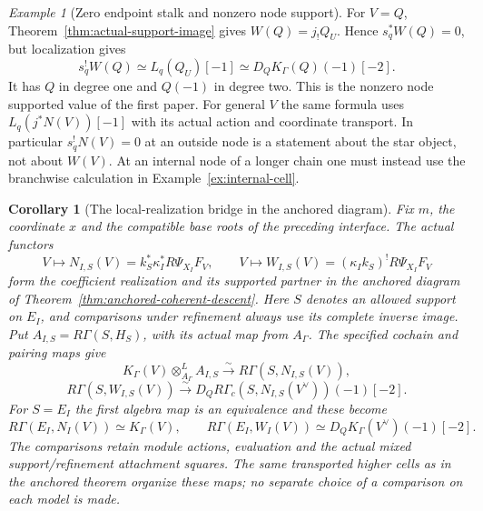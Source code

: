 \documentclass[11pt]{article}
\newtheorem{corollary}[theorem]{Corollary}
\theoremstyle{definition}
\theoremstyle{remark}
\newtheorem{example}[theorem]{Example}
\begin{document}
\begin{example}[Zero endpoint stalk and nonzero node support]
\label{ex:bridge-support-types}
For $V=Q$, Theorem~\ref{thm:actual-support-image} gives
$W(Q)=j_!Q_U$.  Hence $s_q^*W(Q)=0$, but localization gives
\[
 s_q^!W(Q)\simeq L_q(Q_U)[-1]
       \simeq D_QK_\Gamma(Q)(-1)[-2].
\]
It has $Q$ in degree one and $Q(-1)$ in degree two.  This is the
nonzero node supported value of the first paper.  For general $V$
the same formula uses $L_q(j^*N(V))[-1]$ with its actual action and
coordinate transport.  In particular $s_q^!N(V)=0$ at an outside
node is a statement about the star object, not about $W(V)$.
At an internal node of a longer chain one must instead use the
branchwise calculation in Example~\ref{ex:internal-cell}.
\end{example}

\begin{corollary}[The local-realization bridge in the anchored diagram]
\label{cor:family-realization-bridge}
Fix $m$, the coordinate $x$ and the compatible base roots of the
preceding interface.  The actual functors
\[
 V\longmapsto N_{I,S}(V)=k_S^*\kappa_I^*R\Psi_{X_I}F_V,
 \qquad
 V\longmapsto W_{I,S}(V)=(\kappa_Ik_S)^!R\Psi_{X_I}F_V
\]
form the coefficient realization and its supported partner in the
anchored diagram of Theorem~\ref{thm:anchored-coherent-descent}.
Here $S$ denotes an allowed support on $E_I$, and comparisons under
refinement always use its complete inverse image.  Put
$A_{I,S}=R\Gamma(S,H_S)$, with its actual map from $A_\Gamma$.
The specified cochain and pairing maps give
\[
 K_\Gamma(V)\otimes^L_{A_\Gamma}A_{I,S}
       \xrightarrow{\sim}R\Gamma(S,N_{I,S}(V)),
\]
\[
 R\Gamma(S,W_{I,S}(V))\xrightarrow{\sim}
 D_QR\Gamma_c(S,N_{I,S}(V^\vee))(-1)[-2].
\]
For $S=E_I$ the first algebra map is an equivalence and these become
\[
 R\Gamma(E_I,N_I(V))\simeq K_\Gamma(V),\qquad
 R\Gamma(E_I,W_I(V))\simeq D_QK_\Gamma(V^\vee)(-1)[-2].
\]
The comparisons retain module actions, evaluation and the actual mixed
support/refinement attachment squares.  The same transported higher
cells as in the anchored theorem organize these maps; no separate
choice of a comparison on each model is made.
\end{corollary}
\end{document}
